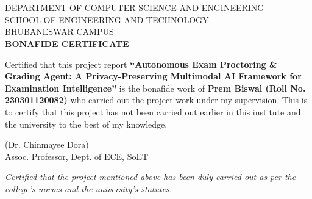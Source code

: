 \documentclass{article}
\begin{document}
\section*{}
\begin{center}
\huge{DEPARTMENT OF COMPUTER SCIENCE AND ENGINEERING}\\[0.5cm]
\normalsize
\textsc{SCHOOL OF ENGINEERING AND TECHNOLOGY\\
BHUBANESWAR CAMPUS}\\[2.0cm]
\underline{\LARGE \textbf{BONAFIDE CERTIFICATE}}\\[1.5cm]
\end{center}
\normalsize Certified that this project report \textbf{``Autonomous Exam Proctoring \& Grading Agent: A Privacy-Preserving Multimodal AI Framework for Examination Intelligence''} is the bonafide work of \textbf{Prem Biswal (Roll No. 230301120082)} who carried out the project work under my supervision. This is to certify that this project has not been carried out earlier in this institute and the university to the best of my knowledge.\\[1.5cm]
\begin{flushright}
(Dr. Chinmayee Dora)\\
Assoc. Professor, Dept. of ECE, SoET\\[1.5cm]
\end{flushright}
\textit{Certified that the project mentioned above has been duly carried out as per the college's norms and the university's statutes.}\\[1.5cm]

\begin{table}[h]
\centering
{}
\end{table}

\vfill
\newpage

\end{document}

